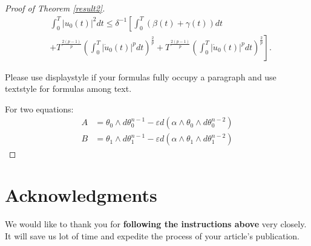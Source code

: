 \documentclass{main}
\begin{document}
\begin{proof}[Proof of Theorem \ref{result2}]
  \begin{equation}\label{Eqn4}
    \begin{split}
      &\int_0^T |u_0(t)|^2dt
       \leq \delta^{-1} \left[\int_0^T (\beta(t)+\gamma(t)) dt \right.\\
      & \left.+ T^{\frac{2(p-1)}{p}}
        \left(\int_0^T |\dot{u}_0(t)|^p dt\right)^{\frac{2}{p}}
        + T^{\frac{2(p-1)}{p}}
        \left(\int_0^T |\dot{u}_0(t)|^p dt\right)^{\frac{2}{p}}\right].
    \end{split}
  \end{equation}


Please use displaystyle if your formulas fully occupy a paragraph and use textstyle for formulas among text.

For two equations:
\begin{align*}
  A & = \theta_0 \wedge d\theta_0^{n-1}
      - \varepsilon d(\alpha \wedge \theta_0 \wedge d\theta_0^{n-2}) \\
  B & =\theta_1 \wedge d\theta_1^{n-1}
      - \varepsilon d(\alpha \wedge \theta_1 \wedge d\theta_1^{n-2})
\end{align*}
\end{proof}

\section*{Acknowledgments}
We would like to thank you for \textbf{following
the instructions above} very closely. It will save us lot of time and expedite the
process of your article's publication.







\end{document}
